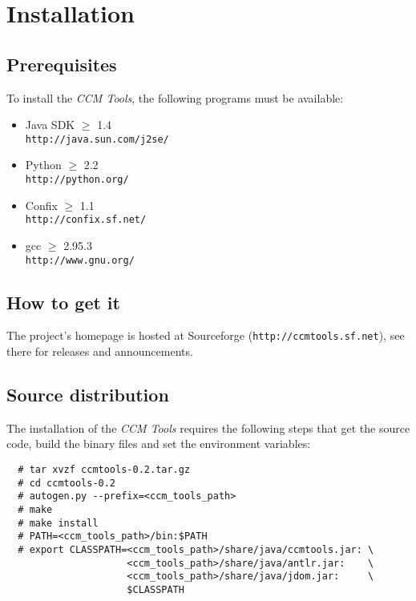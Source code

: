 
\chapter{Installation}

\section{Prerequisites}

To install the {\it CCM Tools}, the following programs must be available:
\begin{itemize}
\item Java SDK $\ge$ 1.4 \\
{\tt http://java.sun.com/j2se/}
\item Python $\ge$ 2.2 \\
{\tt http://python.org/}
\item Confix $\ge$ 1.1 \\
{\tt http://confix.sf.net/}
\item gcc $\ge$ 2.95.3 \\
{\tt http://www.gnu.org/}
\end{itemize}

\section{How to get it}

The project's homepage is hosted at Sourceforge 
({\tt http://ccmtools.sf.net}), see there for releases and announcements.



\section{Source distribution}

The installation of the {\it CCM Tools} requires the following steps that get
the source code, build the binary files and set the environment variables:
\begin{verbatim}
  # tar xvzf ccmtools-0.2.tar.gz
  # cd ccmtools-0.2
  # autogen.py --prefix=<ccm_tools_path>
  # make
  # make install
  # PATH=<ccm_tools_path>/bin:$PATH
  # export CLASSPATH=<ccm_tools_path>/share/java/ccmtools.jar: \
                     <ccm_tools_path>/share/java/antlr.jar:    \
                     <ccm_tools_path>/share/java/jdom.jar:     \
                     $CLASSPATH
\end{verbatim}





